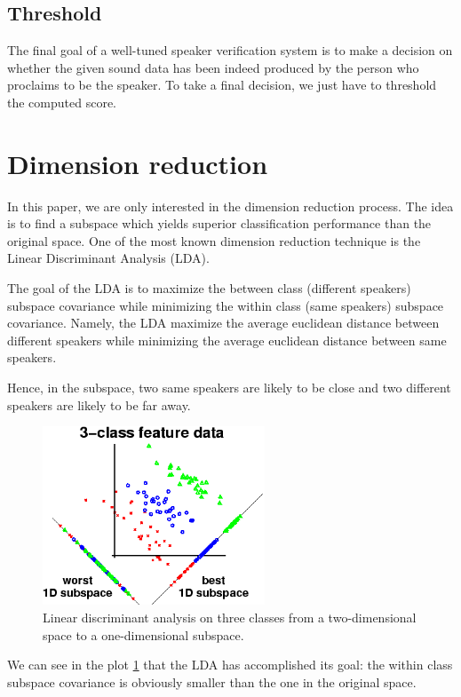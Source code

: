 \documentclass{techrep}
\begin{document}
\subsection{Threshold}

The final goal of a well-tuned speaker verification system is to make a decision
on whether the given sound data has been indeed produced by the person who proclaims
to be the speaker.
To take a final decision, we just have to threshold the computed score.


\section{Dimension reduction}

In this paper, we are only interested in the dimension reduction
process. The idea is to find a subspace which yields superior
classification performance than the original space. One of the most
known dimension reduction technique is the Linear Discriminant
Analysis (LDA).

The goal of the LDA is to maximize the between class (different
speakers) subspace covariance while minimizing the within class (same
speakers) subspace covariance. Namely, the LDA maximize the average
euclidean distance between different speakers while minimizing the
average euclidean distance between same speakers.


Hence, in the subspace, two same speakers are likely to be close and two different
speakers are likely to be far away.

\begin{figure}[H]
  \centering
  \includegraphics[width=250px]{lda}
  \caption{Linear discriminant analysis on three classes from a two-dimensional space to a one-dimensional subspace.}
  \label{lda}
\end{figure}

We can see in the plot \ref{lda} that the LDA has accomplished its
goal: the within class subspace covariance is obviously smaller than
the one in the original space.
\end{document}
